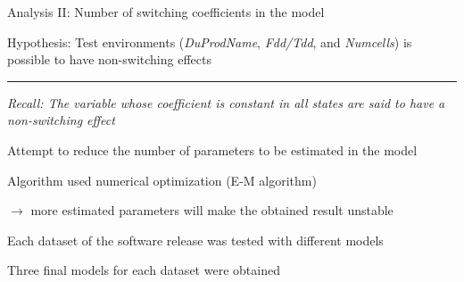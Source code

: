 \documentclass{beamer}
\begin{document}
\begin{frame}[fragile]
Analysis II: Number of switching coefficients in the model

Hypothesis: Test environments (\textit{DuProdName}, \textit{Fdd/Tdd}, and \textit{Numcells}) is possible to have non-switching effects
\rule{\textwidth}{0.4pt}

\begin{itemize}
	\item \small{\textit{Recall: The variable whose coefficient is \textit{constant} in all states are said to have a non-switching effect}}
	
	\item \normalsize{Attempt to reduce the number of parameters to be estimated in the model
	\item Algorithm used numerical optimization (E-M algorithm)
	
	$\rightarrow$ more estimated parameters will make the obtained result unstable 
	
	\item Each dataset of the software release was tested with different models
	\item Three final models for each dataset were obtained}
\end{itemize}

\end{frame}
\end{document}
